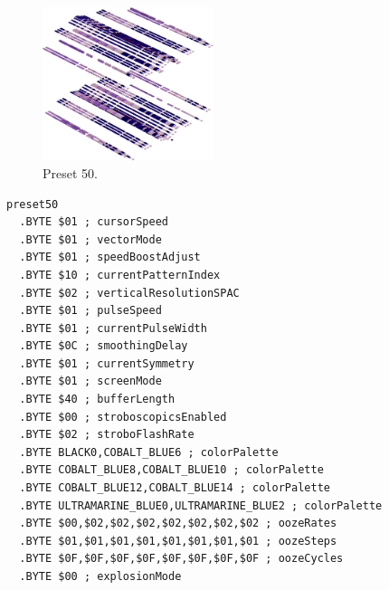\vspace*{-0.5cm}
\begin{minipage}[b]{0.48\linewidth}
\begin{figure}[H]                                                          
  \centering                                                             
  \begin{adjustbox}{width=5cm,center}                                   
  \includegraphics[width=5cm]{src/colorspace_presets/preset50-45.png}%
  \end{adjustbox}                                                        
\caption*{Preset 50.}                                           
\end{figure}                                                               
\end{minipage}
\hspace{0.1cm}
\begin{minipage}[b]{0.48\linewidth}                                                                         
\begin{lstlisting}[basicstyle=\ttfamily\tiny]
preset50
  .BYTE $01 ; cursorSpeed
  .BYTE $01 ; vectorMode
  .BYTE $01 ; speedBoostAdjust
  .BYTE $10 ; currentPatternIndex
  .BYTE $02 ; verticalResolutionSPAC
  .BYTE $01 ; pulseSpeed
  .BYTE $01 ; currentPulseWidth
  .BYTE $0C ; smoothingDelay
  .BYTE $01 ; currentSymmetry
  .BYTE $01 ; screenMode
  .BYTE $40 ; bufferLength
  .BYTE $00 ; stroboscopicsEnabled
  .BYTE $02 ; stroboFlashRate
  .BYTE BLACK0,COBALT_BLUE6 ; colorPalette
  .BYTE COBALT_BLUE8,COBALT_BLUE10 ; colorPalette
  .BYTE COBALT_BLUE12,COBALT_BLUE14 ; colorPalette
  .BYTE ULTRAMARINE_BLUE0,ULTRAMARINE_BLUE2 ; colorPalette
  .BYTE $00,$02,$02,$02,$02,$02,$02,$02 ; oozeRates
  .BYTE $01,$01,$01,$01,$01,$01,$01,$01 ; oozeSteps
  .BYTE $0F,$0F,$0F,$0F,$0F,$0F,$0F,$0F ; oozeCycles
  .BYTE $00 ; explosionMode
\end{lstlisting}
\end{minipage}


